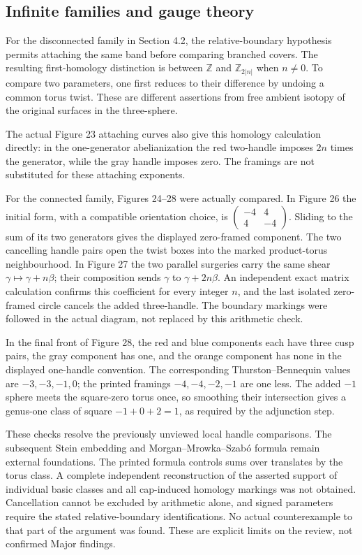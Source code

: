 \documentclass[10pt]{article}
\begin{document}
\subsection*{Infinite families and gauge theory}
For the disconnected family in Section 4.2, the relative-boundary hypothesis permits attaching the same band before comparing branched covers. The resulting first-homology distinction is between \(\mathbb Z\) and \(\mathbb Z_{2|n|}\) when \(n\neq0\). To compare two parameters, one first reduces to their difference by undoing a common torus twist. These are different assertions from free ambient isotopy of the original surfaces in the three-sphere.\par
The actual Figure 23 attaching curves also give this homology calculation directly: in the one-generator abelianization the red two-handle imposes \(2n\) times the generator, while the gray handle imposes zero. The framings are not substituted for these attaching exponents.\par
For the connected family, Figures 24–28 were actually compared. In Figure 26 the initial form, with a compatible orientation choice, is \(\left(\begin{smallmatrix}-4&4\\4&-4\end{smallmatrix}\right)\). Sliding to the sum of its two generators gives the displayed zero-framed component. The two cancelling handle pairs open the twist boxes into the marked product-torus neighbourhood. In Figure 27 the two parallel surgeries carry the same shear \(\gamma\mapsto\gamma+n\beta\); their composition sends \(\gamma\) to \(\gamma+2n\beta\). An independent exact matrix calculation confirms this coefficient for every integer \(n\), and the last isolated zero-framed circle cancels the added three-handle. The boundary markings were followed in the actual diagram, not replaced by this arithmetic check.\par
In the final front of Figure 28, the red and blue components each have three cusp pairs, the gray component has one, and the orange component has none in the displayed one-handle convention. The corresponding Thurston–Bennequin values are \(-3,-3,-1,0\); the printed framings \(-4,-4,-2,-1\) are one less. The added \(-1\) sphere meets the square-zero torus once, so smoothing their intersection gives a genus-one class of square \(-1+0+2=1\), as required by the adjunction step.\par
These checks resolve the previously unviewed local handle comparisons. The subsequent Stein embedding and Morgan–Mrowka–Szabó formula remain external foundations. The printed formula controls sums over translates by the torus class. A complete independent reconstruction of the asserted support of individual basic classes and all cap-induced homology markings was not obtained. Cancellation cannot be excluded by arithmetic alone, and signed parameters require the stated relative-boundary identifications. No actual counterexample to that part of the argument was found. These are explicit limits on the review, not confirmed Major findings.\par
\end{document}
